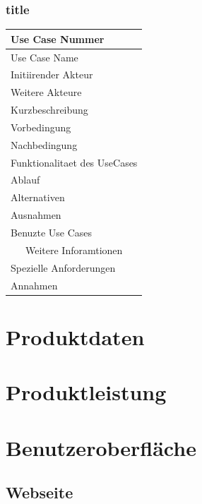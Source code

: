\documentclass[10pt,a4paper]{article}
\begin{document}
\subsubsection{title}
		\begin{tabular}{|l|p{.5\linewidth}|}
		\hline Use Case Nummer &  \\ 
		\hline Use Case Name &  \\ 
		\hline Initiirender Akteur &  \\
		\hline Weitere Akteure &  \\
		\hline Kurzbeschreibung &  \\
		\hline Vorbedingung &  \\
		\hline Nachbedingung &  \\
		\hline \multicolumn{2}{|c|}{Funktionalitaet des UseCases}\\
		\hline Ablauf &  \\
		\hline Alternativen &  \\
		\hline Ausnahmen &  \\
		\hline Benuzte Use Cases &  \\
		\hline \multicolumn{2}{|c|}{Weitere Inforamtionen} \\
		\hline Spezielle Anforderungen &  \\
		\hline Annahmen &  \\
		\hline
		\end{tabular}

\section{Produktdaten}

\section{Produktleistung}

\section{Benutzeroberfl\"ache}
\subsection{Webseite}
\end{document}
